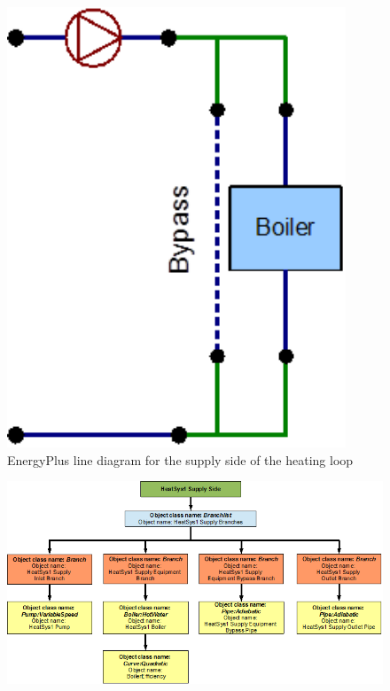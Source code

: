 \begin{figure}[hbtp] %
\centering
\includegraphics[width=0.9\textwidth, height=0.9\textheight, keepaspectratio=true]{media/image077.png}
\caption{EnergyPlus line diagram for the supply side of the heating loop \protect \label{fig:energyplus-line-diagram-for-the-supply-side-004}}
\end{figure}

\begin{figure}[htbp]
\centering
\includegraphics{media/image078.png}
\caption{}
\end{figure}

